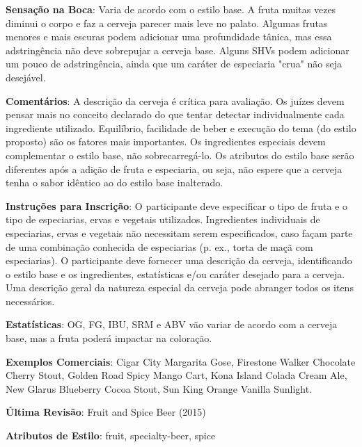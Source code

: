 \textbf{Sensação na Boca}: Varia de acordo com o estilo base. A fruta muitas vezes diminui o corpo e faz a cerveja parecer mais leve no palato. Algumas frutas menores e mais escuras podem adicionar uma profundidade tânica, mas essa adstringência não deve sobrepujar a cerveja base. Alguns SHVs podem adicionar um pouco de adstringência, ainda que um caráter de especiaria "crua" não seja desejável.

\textbf{Comentários}: A descrição da cerveja é crítica para avaliação. Os juízes devem pensar mais no conceito declarado do que tentar detectar individualmente cada ingrediente utilizado. Equilíbrio, facilidade de beber e execução do tema (do estilo proposto) são os fatores mais importantes. Os ingredientes especiais devem complementar o estilo base, não sobrecarregá-lo. Os atributos do estilo base serão diferentes após a adição de fruta e especiaria, ou seja, não espere que a cerveja tenha o sabor idêntico ao do estilo base inalterado.

\textbf{Instruções para Inscrição}: O participante deve especificar o tipo de fruta e o tipo de especiarias, ervas e vegetais utilizados. Ingredientes individuais de especiarias, ervas e vegetais não necessitam serem especificados, caso façam parte de uma combinação conhecida de especiarias (p. ex., torta de maçã com especiarias). O participante deve fornecer uma descrição da cerveja, identificando o estilo base e os ingredientes, estatísticas e/ou caráter desejado para a cerveja. Uma descrição geral da natureza especial da cerveja pode abranger todos os itens necessários.

\textbf{Estatísticas}: OG, FG, IBU, SRM e ABV vão variar de acordo com a cerveja base, mas a fruta poderá impactar na coloração.

\textbf{Exemplos Comerciais}: Cigar City Margarita Gose, Firestone Walker Chocolate Cherry Stout, Golden Road Spicy Mango Cart, Kona Island Colada Cream Ale, New Glarus Blueberry Cocoa Stout, Sun King Orange Vanilla Sunlight.

\textbf{Última Revisão}: Fruit and Spice Beer (2015)

\textbf{Atributos de Estilo}: fruit, specialty-beer, spice
